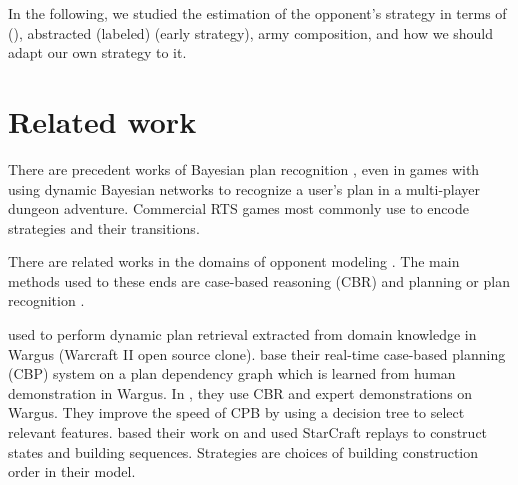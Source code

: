 In the following, we studied the estimation of the opponent's strategy in terms of  (), abstracted (labeled)  (early strategy), army composition, and how we should adapt our own strategy to it.

\section{Related work}


There are precedent works of Bayesian plan recognition \citep{BMPR}, even in games with \citep{BayesianRecog} using dynamic Bayesian networks to recognize a user's plan in a multi-player dungeon adventure. Commercial RTS games most commonly use  \citep{FSM_AIGameProgWisdom2003} to encode strategies and their transitions.

There are related works in the domains of opponent modeling \citep{HsiehS08,schadd2007opponent,Kabanza2010}. The main methods used to these ends are case-based reasoning (CBR) and planning or plan recognition \citep{LTW,CBR_Planning,OntanonCBR,HTNPlanning,Ramirez}.

\cite{LTW} used  to perform dynamic plan retrieval extracted from domain knowledge in Wargus (Warcraft II open source clone). \cite{CBR_Planning} base their real-time case-based planning (CBP) system on a plan dependency graph which is learned from human demonstration in Wargus. In \citep{OntanonCBR,PlanRetrieval}, they use CBR and expert demonstrations on Wargus. %
They improve the speed of CPB by using a decision tree to select relevant features. \cite{HsiehS08} based their work on \citep{LTW} and used StarCraft replays to construct states and building sequences. Strategies are choices of building construction order in their model. 

